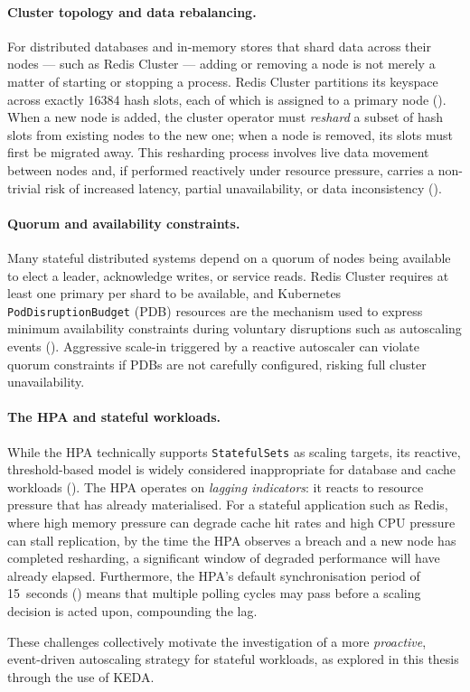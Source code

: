 \paragraph{Cluster topology and data rebalancing.}
For distributed databases and in-memory stores that shard data across their
nodes — such as Redis Cluster — adding or removing a node is not merely a
matter of starting or stopping a process. Redis Cluster partitions its keyspace
across exactly \num{16384} hash slots, each of which is assigned to a primary
node (\cite{redis:clusterspec}). When a new node is added, the cluster operator
must \textit{reshard} a subset of hash slots from existing nodes to the new
one; when a node is removed, its slots must first be migrated away. This
resharding process involves live data movement between nodes and, if performed
reactively under resource pressure, carries a non-trivial risk of increased
latency, partial unavailability, or data inconsistency
(\cite{googlecloud:zerodowntime}).

\paragraph{Quorum and availability constraints.}
Many stateful distributed systems depend on a quorum of nodes being available
to elect a leader, acknowledge writes, or service reads. Redis Cluster requires
at least one primary per shard to be available, and Kubernetes
\texttt{PodDisruptionBudget} (PDB) resources are the mechanism used to
express minimum availability constraints during voluntary disruptions such as
autoscaling events (\cite{kubernetes:disruptions}). Aggressive scale-in
triggered by a reactive autoscaler can violate quorum constraints if PDBs are
not carefully configured, risking full cluster unavailability.

\paragraph{The HPA and stateful workloads.}
While the HPA technically supports \texttt{StatefulSets} as scaling targets,
its reactive, threshold-based model is widely considered inappropriate for
database and cache workloads (\cite{hpa:bestpractices}). The HPA operates on
\textit{lagging indicators}: it reacts to resource pressure that has already
materialised. For a stateful application such as Redis, where high memory
pressure can degrade cache hit rates and high CPU pressure can stall
replication, by the time the HPA observes a breach and a new node has
completed resharding, a significant window of degraded performance will have
already elapsed. Furthermore, the HPA's default synchronisation period of
15~seconds (\cite{keda:scalingdeployments}) means that multiple polling cycles
may pass before a scaling decision is acted upon, compounding the lag.

These challenges collectively motivate the investigation of a more
\textit{proactive}, event-driven autoscaling strategy for stateful workloads,
as explored in this thesis through the use of KEDA.
